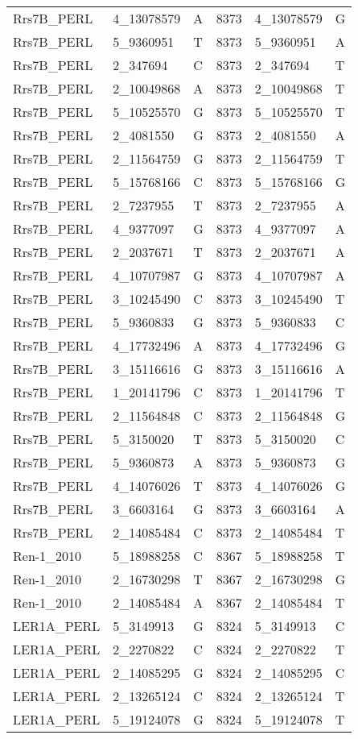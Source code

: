 \begin{center}
\begin{longtable}{|l|l|l|l|l|l|}
Rrs7B\_PERL&4\_13078579&A&8373&4\_13078579&G\\
Rrs7B\_PERL&5\_9360951&T&8373&5\_9360951&A\\
Rrs7B\_PERL&2\_347694&C&8373&2\_347694&T\\
Rrs7B\_PERL&2\_10049868&A&8373&2\_10049868&T\\
Rrs7B\_PERL&5\_10525570&G&8373&5\_10525570&T\\
Rrs7B\_PERL&2\_4081550&G&8373&2\_4081550&A\\
Rrs7B\_PERL&2\_11564759&G&8373&2\_11564759&T\\
Rrs7B\_PERL&5\_15768166&C&8373&5\_15768166&G\\
Rrs7B\_PERL&2\_7237955&T&8373&2\_7237955&A\\
Rrs7B\_PERL&4\_9377097&G&8373&4\_9377097&A\\
Rrs7B\_PERL&2\_2037671&T&8373&2\_2037671&A\\
Rrs7B\_PERL&4\_10707987&G&8373&4\_10707987&A\\
Rrs7B\_PERL&3\_10245490&C&8373&3\_10245490&T\\
Rrs7B\_PERL&5\_9360833&G&8373&5\_9360833&C\\
Rrs7B\_PERL&4\_17732496&A&8373&4\_17732496&G\\
Rrs7B\_PERL&3\_15116616&G&8373&3\_15116616&A\\
Rrs7B\_PERL&1\_20141796&C&8373&1\_20141796&T\\
Rrs7B\_PERL&2\_11564848&C&8373&2\_11564848&G\\
Rrs7B\_PERL&5\_3150020&T&8373&5\_3150020&C\\
Rrs7B\_PERL&5\_9360873&A&8373&5\_9360873&G\\
Rrs7B\_PERL&4\_14076026&T&8373&4\_14076026&G\\
Rrs7B\_PERL&3\_6603164&G&8373&3\_6603164&A\\
Rrs7B\_PERL&2\_14085484&C&8373&2\_14085484&T\\
Ren-1\_2010&5\_18988258&C&8367&5\_18988258&T\\
Ren-1\_2010&2\_16730298&T&8367&2\_16730298&G\\
Ren-1\_2010&2\_14085484&A&8367&2\_14085484&T\\
LER1A\_PERL&5\_3149913&G&8324&5\_3149913&C\\
LER1A\_PERL&2\_2270822&C&8324&2\_2270822&T\\
LER1A\_PERL&2\_14085295&G&8324&2\_14085295&C\\
LER1A\_PERL&2\_13265124&C&8324&2\_13265124&T\\
LER1A\_PERL&5\_19124078&G&8324&5\_19124078&T\\

\end{longtable}
\end{center}
